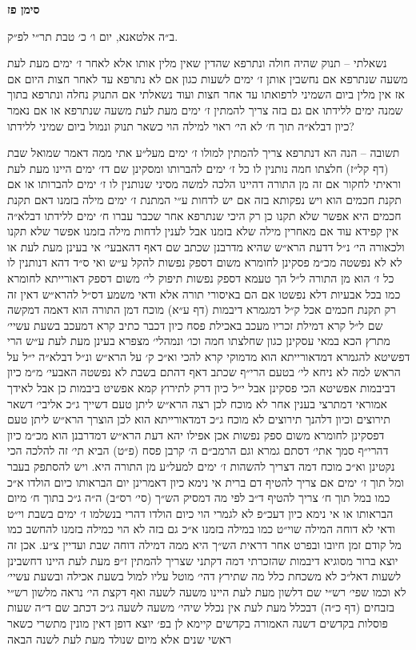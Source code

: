 \documentclass[12pt, openany]{book}
\newcommand{\chapname}{}
\newcommand{\newchap}[1]{
	\addcontentsline{toc}{chapter}{#1}
	\renewcommand{\chapname}{#1}
		\begin{center}
			\textbf{%
\fontsize{16pt}{16pt}\selectfont
				#1}
		\end{center}
}
\begin{document}
\newchap{סימן פז}
\begin{multicols}{2}
ב״ה אלטאנא, יום ו׳ כ׳ טבת תר״י לפ״ק.\\\vspace{0pt}

נשאלתי – תנוק שהיה חולה ונתרפא שהדין שאין מלין אותו אלא לאחר ז׳ ימים מעת לעת משעה שנתרפא אם נחשבין אותן ז׳ ימים לשעות כגון אם לא נתרפא עד לאחר חצות היום אם אז אין מלין ביום השמיני לרפואתו עד אחר חצות ועוד נשאלתי אם התנוק נחלה ונתרפא בתוך שמנה ימים ללידתו אם גם בזה צריך להמתין ז׳ ימים מעת לעת משעה שנתרפא או אם נאמר כיון דבלא״ה תוך ח׳ לא הי׳ ראוי למילה הוי כשאר תנוק ונמול ביום שמיני ללידתו?\\\vspace{0pt}

תשובה – הנה הא דנתרפא צריך להמתין למולו ז׳ ימים מעל״ע אתי ממה דאמר שמואל שבת (דף קל״ז) חלצתו חמה נותנין לו כל ז׳ ימים להברותו ומסקינן שם דז׳ ימים היינו מעת לעת וראיתי לחקור אם זה מן התורה דהיינו הלכה למשה מסיני שנותנין לו ז׳ ימים להברותו או אם תקנת חכמים הוא ויש נפקותא בזה אם יש לדחות ע״י המתנת ז׳ ימים מילה בזמנו דאם תקנת חכמים היא אפשר שלא תקנו כן רק היכי שנתרפא אחר שכבר עברו ח׳ ימים ללידתו דבלא״ה אין קפידא עוד אם מאחרין מילה שלא בזמנו אבל לענין לדחות מילה בזמנו אפשר שלא תקנו ולכאורה הי׳ נ״ל דדעת הרא״ש שהיא מדרבנן שכתב שם דאף דהאבעי׳ אי בעינן מעת לעת או לא לא נפשטה מכ״מ פסקינן לחומרא משום דספק נפשות להקל ע״ש ואי ס״ד דהא דנותנין לו כל ז׳ הוא מן התורה ל״ל הך טעמא דספק נפשות תיפוק לי׳ משום דספק דאורייתא לחומרא כמו בכל אבעיות דלא נפשטו אם הם באיסורי תורה אלא ודאי משמע דס״ל להרא״ש דאין זה רק תקנת חכמים אכל ק״ל דמגמרא דיבמות (דף ע״א) מוכח דמן התורה הוא דאמה דמקשה שם ל״ל קרא דמילת זכריו מעכב באכילת פסח כיון דכבר כתיב קרא דמעכב בשעת עשיי׳ מתרץ הכא במאי עסקינן כגון שחלצתו חמה וכו׳ ונמהלי׳ מצפרא בעינן מעת לעת ע״ש הרי דפשיטא להגמרא דמדאורייתא הוא מדמוקי קרא להכי וא״כ ק׳ על הרא״ש ונ״ל דבלא״ה י״ל על הראש למה לא ניחא לי׳ בטעם הרי״ף שכתב דאף דהתם בשבת לא נפשטה האבעי׳ מ״מ כיון דביבמות אפשיטא הכי פסקינן אבל י״ל כיון דרק לתירוץ קמא אפשיט ביבמות כן אבל לאידך אמוראי דמתרצי בענין אחר לא מוכח לכן רצה הרא״ש ליתן טעם דשייך ג״כ אליבי׳ דשאר תירוצים וכיון דלהנך תירוצים לא מוכח ג״כ דמדאורייתא הוא לכן הוצרך הרא״ש ליתן טעם דפסקינן לחומרא משום ספק נפשות אכן אפילו יהא דעת הרא״ש דמדרבנן הוא מכ״מ כיון דהרי״ף סמך אתי׳ דסתם גמרא וגם הרמב״ם ה׳ קרבן פסח (פ״ט) הביא תי׳ זה להלכה הכי נקטינן וא״כ מוכח דמה דצריך להשהות ז׳ ימים למעל״ע מן התורה היא. ויש להסתפק בעבר ומל תוך ז׳ ימים אם צריך להטיף דם ברית אי נימא כיון דאמרינן יום הבראותו כיום הולדו א״כ כמו במל תוך ח׳ צריך להטיף ד״ב לפי מה דמסיק הש״ך (סי׳ רס״ב) ה״ה ג״כ בתוך ח׳ מיום הבראותו או אי נימא כיון דעכ״פ לא לגמרי הוי כיום הולדו דהרי בנשלמו ז׳ ימים בשבת וי״ט ודאי לא דוחה המילה שוי״ט כמו במילה בזמנו א״כ גם בזה לא הוי כמילה בזמנו להחשב כמו מל קודם זמן חיובו ובפרט אחר דראית הש״ך היא ממה דמילה דוחה שבת ועדיין צ״ע. אכן זה יוצא ברור מסוגיא דיבמות שהזכרתי דמה דקתני שצריך להמתין ז״פ מעת לעת היינו דחשבינן לשעות דאל״כ לא משכחת כלל מה שתירץ דהי׳ מוטל עליו למול בשעת אכילה ובשעת עשיי׳ לא וכמו שפי׳ רש״י שם דלשון מעת לעת היינו משעה לשעה ואף דקצת הי׳ נראה מלשון רש״י בזבחים (דף כ״ה) דבכלל מעת לעת אין נכלל שיהי׳ משעה לשעה ג״כ דכתב שם ד״ה שעות פוסלות בקדשים דשנה האמורה בקדשים קיימא לן בפ׳ יוצא דופן דאין מונין מתשרי כשאר ראשי שנים אלא מיום שנולד מעת לעת לשנה הבאה 
\end{multicols}
\end{document}
